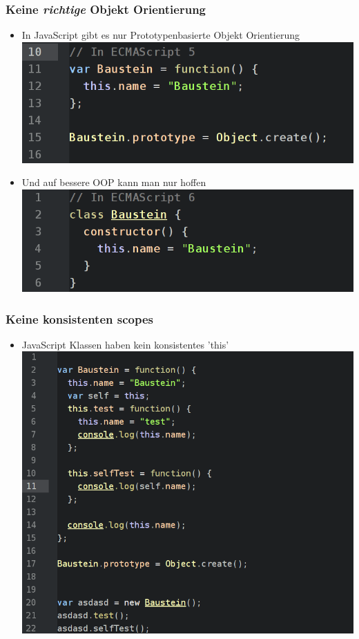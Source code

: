 \documentclass{beamer}
\begin{document}
\begin{frame}
\frametitle{Keine \textit{richtige} Objekt Orientierung}
\begin{itemize}
\item In JavaScript gibt es nur Prototypenbasierte Objekt Orientierung
\includegraphics[scale=0.3]{assets/noclassesES5.png}
\item Und auf bessere OOP kann man nur hoffen
\includegraphics[scale=0.3]{assets/noclassesES6.png}
\end{itemize}
\end{frame}


\begin{frame}
\frametitle{Keine konsistenten scopes}
\begin{itemize}
\item JavaScript Klassen haben kein konsistentes 'this'
\\
\includegraphics[scale=0.31]{assets/conthis.png}
\end{itemize}
\end{frame}
\end{document}
